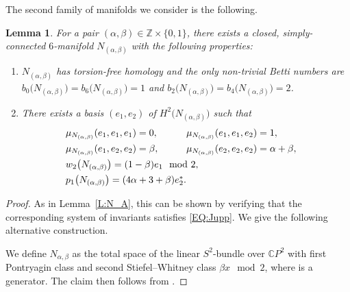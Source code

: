 \documentclass[10pt,a4paper]{amsart}
\numberwithin{equation}{section}
\newtheorem{Lemma}[Theorem]{Lemma}
\theoremstyle{definition}
\numberwithin{table}{section}
\newcommand{\Z}{\mathbb{Z}}
\newcommand{\C}{\mathbb{C}}
\begin{document}
The second family of manifolds we consider is the following.

\begin{Lemma}%
	For a pair $(\alpha,\beta)\in\Z\times\{0,1\}$, there exists a closed, simply-connected $6$-manifold $N_{(\alpha,\beta)}$ with the following properties:
	\begin{enumerate}\itemsep=0pt
		\item[$(1)$] $N_{(\alpha,\beta)}$ has torsion-free homology and the only non-trivial Betti numbers are $b_0\bigl(N_{(\alpha,\beta)}\bigr)=b_6\bigl(N_{(\alpha,\beta)}\bigr)=1$ and $b_2\bigl(N_{(\alpha,\beta)}\bigr)=b_4\bigl(N_{(\alpha,\beta)}\bigr)=2$.
		\item[$(2)$] There exists a basis $(e_1,e_2)$ of $H^2\bigl(N_{(\alpha,\beta)}\bigr)$ such that
		\begin{alignat*}{3}
			&\mu_{N_{(\alpha,\beta)}}(e_1,e_1,e_1)=0,\qquad&&
			\mu_{N_{(\alpha,\beta)}}(e_1,e_1,e_2)=1,&\\
			&\mu_{N_{(\alpha,\beta)}}(e_1,e_2,e_2)=\beta,\qquad&&
			\mu_{N_{(\alpha,\beta)}}(e_2,e_2,e_2)=\alpha+\beta,&\\
			&\makebox[0pt][l]{$w_2\bigl(N_{(\alpha,\beta)}\bigr)=(1-\beta)e_1\mod 2,$}&\\
			&\makebox[0pt][l]{$p_1\bigl(N_{(\alpha,\beta)}\bigr)=(4\alpha+3+\beta)e_2^*.$}&
		\end{alignat*}
	\end{enumerate}
\end{Lemma}
\begin{proof}
	As in Lemma~\ref{L:N_A}, this can be shown by verifying that the corresponding system of invariants satisfies \eqref{EQ:Jupp}. We give the following alternative construction.
	
	We define $N_{\alpha,\beta}$ as the total space of the linear $S^2$-bundle over $\C P^2$ with first Pontryagin class \smash{$(4\alpha+\beta)\bigl[\C P^2\bigr]^*$} and second Stiefel--Whitney class $\beta x\mod 2$, where \smash{$x\in H^2\bigl(\C P^2\bigr)\cong \Z$} is a generator. The claim then follows from \cite[Corollary 5.8]{Re23}.
\end{proof}
\end{document}
